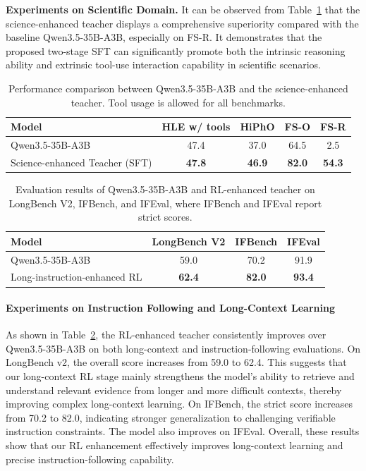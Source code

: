 \documentclass{llmxive}
\providecommand{\arraystretch}{1.4}
\begin{document}
\textbf{Experiments on Scientific Domain.} It can be observed from Table~\ref{tab:sci-enhanced-teacher} that the science-enhanced teacher displays a comprehensive superiority compared with the baseline Qwen3.5-35B-A3B, especially on FS-R. It demonstrates that the proposed two-stage SFT can significantly promote both the intrinsic reasoning ability and extrinsic tool-use interaction capability in scientific scenarios. 

\begin{table}[]
\footnotesize
\centering
\setlength{\tabcolsep}{8pt}
\renewcommand{\arraystretch}{1.4}
\begin{tabular}{lcccc}
\midrule
Model & HLE w/ tools  & HiPhO & FS-O & FS-R \\ 
\midrule
Qwen3.5-35B-A3B & 47.4 & 37.0  & 64.5 & 2.5  \\
Science-enhanced Teacher (SFT) & \textbf{47.8} & \textbf{46.9} & \textbf{82.0} & \textbf{54.3} \\ 
\midrule
\end{tabular}
\caption{Performance comparison between Qwen3.5-35B-A3B and the science-enhanced teacher. Tool usage is allowed for all benchmarks.}
\label{tab:sci-enhanced-teacher}
\end{table}
\begin{table}[t]
\footnotesize
\centering
\setlength{\tabcolsep}{4pt}
\renewcommand{\arraystretch}{1.3}
\begin{tabular}{lccc}
\toprule
\textbf{Model}
& \textbf{LongBench V2}
& \textbf{IFBench}
& \textbf{IFEval} \\
\midrule

Qwen3.5-35B-A3B
& 59.0
& 70.2
& 91.9 \\

Long-instruction-enhanced RL
& \textbf{62.4}
& \textbf{82.0}
& \textbf{93.4} \\
\bottomrule
\end{tabular}
\label{tab:long_sft_rl_results}
\caption{Evaluation results of Qwen3.5-35B-A3B and RL-enhanced teacher on LongBench V2, IFBench, and IFEval, where IFBench and IFEval report strict scores.}
\end{table}

\paragraph{Experiments on Instruction Following and Long-Context Learning}
As shown in Table~\ref{tab:long_sft_rl_results}, the RL-enhanced teacher consistently improves over Qwen3.5-35B-A3B on both long-context and instruction-following evaluations. On LongBench v2, the overall score increases from 59.0 to 62.4. This suggests that our long-context RL stage mainly strengthens the model's ability to retrieve and understand relevant evidence from longer and more difficult contexts, thereby improving complex long-context learning. On IFBench, the strict score increases from 70.2 to 82.0, indicating stronger generalization to challenging verifiable instruction constraints. The model also improves on IFEval. Overall, these results show that our RL enhancement effectively improves long-context learning and precise instruction-following capability.
\end{document}

